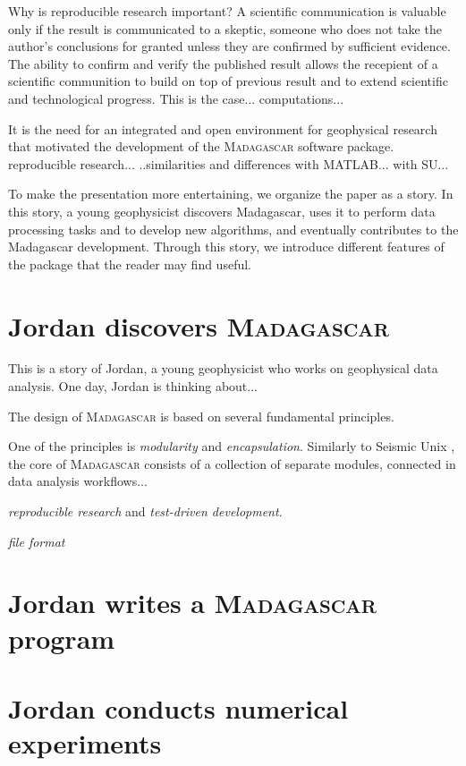 Why is reproducible research important? A scientific communication is
valuable only if the result is communicated to a skeptic, someone who
does not take the author's conclusions for granted unless they are
confirmed by sufficient evidence. The ability to confirm and verify
the published result allows the recepient of a scientific communition
to build on top of previous result and to extend scientific and
technological progress. This is the case... computations...

It is the need for an integrated and open environment for geophysical
research that motivated the development of the
\textsc{Madagascar} software package. reproducible research... ..similarities and
differences with MATLAB... with SU...

To make the presentation more entertaining, we organize the paper as a
story. In this story, a young geophysicist discovers Madagascar, uses
it to perform data processing tasks and to develop new algorithms, and
eventually contributes to the Madagascar development. Through this
story, we introduce different features of the package that the reader
may find useful.

\section{Jordan discovers \textsc{Madagascar}}

This is a story of Jordan, a young geophysicist who works on
geophysical data analysis. One day, Jordan is thinking about...

The design of \textsc{Madagascar} is based on several fundamental
principles. 

One of the principles is \emph{modularity} and
\emph{encapsulation}. Similarly to Seismic Unix \cite[]{TLE16-07-10451049},
the core of \textsc{Madagascar} consists of a collection of separate
modules, connected in data analysis workflows...

\emph{reproducible research} and \emph{test-driven development}.

\emph{file format} 

\section{Jordan writes a \textsc{Madagascar} program}

\section{Jordan conducts numerical experiments}

